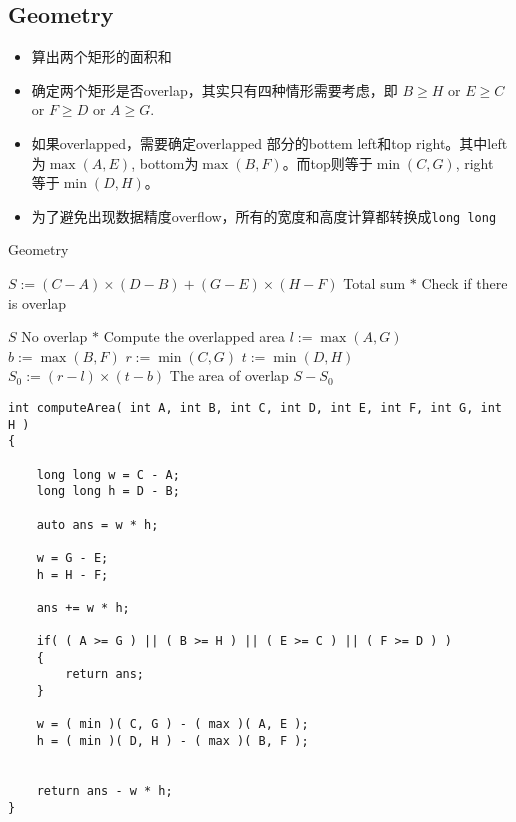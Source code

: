 \subsection{Geometry}
\begin{CJK*}{UTF8}{gbsn}
\begin{itemize}
\item 算出两个矩形的面积和
\item 确定两个矩形是否overlap，其实只有四种情形需要考虑，即 $B\geq H$ or $E\geq C$ or $F\geq D$ or $A\geq G$.
\item 如果overlapped，需要确定overlapped 部分的bottem left和top right。其中left为$\max(A,E)$, bottom为$\max(B, F)$。而top则等于$\min(C,G)$, right
等于$\min(D,H)$。
\item 为了避免出现数据精度overflow，所有的宽度和高度计算都转换成\texttt{long long}
\end{itemize}
\end{CJK*}
\setcounter{algorithm}{0}
\begin{algorithm}[H]
\caption{Geometry}
\begin{algorithmic}[1]
\State $S:=(C-A)\times(D-B) + (G-E)\times(H-F)$ \Comment Total sum
\State $\ast$ Check if there is overlap
\end{algorithmic}
\end{algorithm}
\begin{algorithm}[H]
\begin{algorithmic}[1]
\State \Return $S$ \Comment No overlap
\EndIf
\State $\ast$ Compute the overlapped area
\State $l:=\max(A, G)$
\State $b:=\max(B, F)$
\State $r:=\min(C, G)$
\State $t:=\min(D, H)$
\State $S_0:=(r-l)\times(t-b)$ \Comment The area of overlap
\State \Return $S-S_0$
\EndProcedure
\end{algorithmic}
\end{algorithm}
\setcounter{lstlisting}{0}
\begin{lstlisting}[style=customc, caption={Geometry}]
int computeArea( int A, int B, int C, int D, int E, int F, int G, int H )
{

    long long w = C - A;
    long long h = D - B;

    auto ans = w * h;

    w = G - E;
    h = H - F;

    ans += w * h;

    if( ( A >= G ) || ( B >= H ) || ( E >= C ) || ( F >= D ) )
    {
        return ans;
    }

    w = ( min )( C, G ) - ( max )( A, E );
    h = ( min )( D, H ) - ( max )( B, F );


    return ans - w * h;
}
\end{lstlisting}